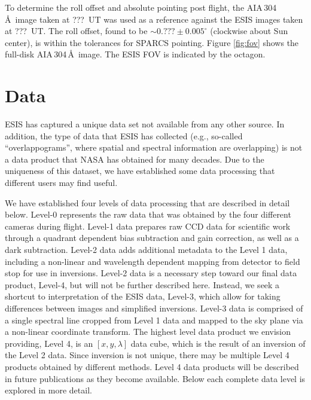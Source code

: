 		To determine the roll offset and absolute pointing post flight, the AIA\,304\,\AA\ image taken at ???~UT was used as a reference against the ESIS images taken at ???~UT.  The roll offset, found to be $\sim0.???\pm 0.005^\circ$ (clockwise about Sun center), is within the tolerances for SPARCS pointing.  Figure \ref{fig:fov} shows the full-disk AIA\,304\,\AA\ image. The ESIS FOV is indicated by the octagon.  
	
\section{Data} 

	ESIS has captured a unique data set not  available from any other source.  
	In addition, the type of data that ESIS has collected (e.g., so-called ``overlappograms'', where spatial and spectral information are overlapping) is not a data product that NASA has obtained for many decades.  Due to the uniqueness of this dataset, we have established some data processing that different users may find useful.
  
    We have established four levels of data processing that are described in detail below.
    Level-0 represents the raw data that was obtained by the four different cameras during flight.
    Level-1 data prepares raw CCD data for scientific work through a quadrant dependent bias subtraction and gain correction, as well as a dark subtraction.  
    Level-2 data adds additional metadata to the Level 1 data, including a non-linear and wavelength dependent mapping from detector to field stop for use in inversions. 
    Level-2 data is a necessary step toward our final data product, Level-4, but will not be further described here. 
    Instead, we seek a shortcut to interpretation of the ESIS data, Level-3, which allow for taking differences between images and simplified inversions.
    Level-3 data is comprised of a single spectral line cropped from Level 1 data and mapped to the sky plane via a non-linear coordinate transform.
    The highest level data product we envision providing, Level 4, is an $[x, y , \lambda]$ data cube, which is the result of an inversion of the Level 2 data. Since inversion is not unique, there may be multiple Level 4 products obtained by different methods.  Level 4 data products will be described in future publications as they become available.  
    Below each complete data level is explored in more detail.
    
